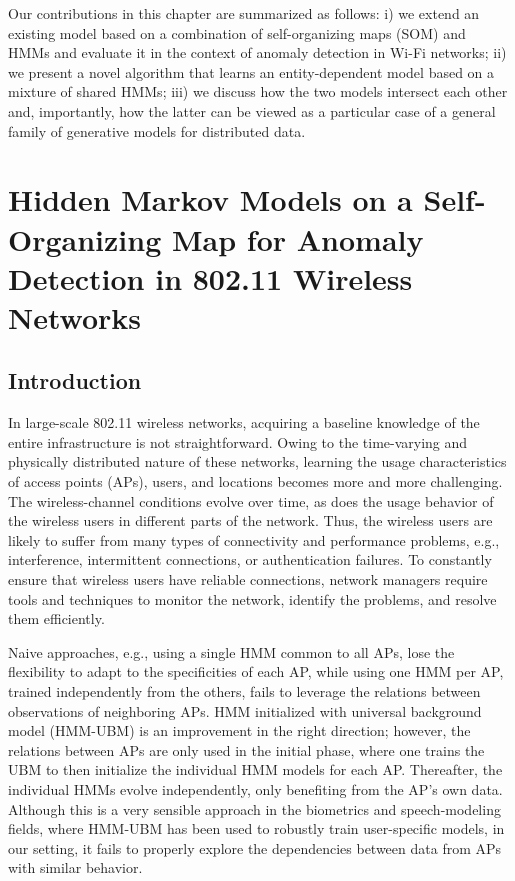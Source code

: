 Our contributions in this chapter are summarized as follows: i) we extend an existing model based on a combination of self-organizing maps (SOM) and HMMs and evaluate it in the context of anomaly detection in Wi-Fi networks; ii) we present a novel algorithm that learns an entity-dependent model based on a mixture of shared HMMs; iii) we discuss how the two models intersect each other and, importantly, how the latter can be viewed as a particular case of a general family of generative models for distributed data.

\section{Hidden Markov Models on a Self-Organizing Map for Anomaly Detection in 802.11 Wireless Networks}
\label{sec:sohmmm}

\subsection{Introduction}
\label{sec:sohmmm_intro}
In large-scale 802.11 wireless networks, acquiring a baseline knowledge of the entire infrastructure is not straightforward. Owing to the time-varying and physically distributed nature of these networks, learning the usage characteristics of access points (APs), users, and locations becomes more and more challenging. The wireless-channel conditions evolve over time, as does the usage behavior of the wireless users in different parts of the network. Thus, the wireless users are likely to suffer from many types of connectivity and performance problems, e.g., interference, intermittent connections, or authentication failures. To constantly ensure that wireless users have reliable connections, network managers require tools and techniques to monitor the network, identify the problems, and resolve them efficiently.

Naive approaches, e.g., using a single HMM common to all APs, lose the flexibility to adapt to the specificities of each AP, while using one HMM per AP, trained independently from the others, fails to leverage the relations between observations of neighboring APs. HMM initialized with universal background model (HMM-UBM) \cite{Ref7} is an improvement in the right direction; however, the relations between APs are only used in the initial phase, where one trains the UBM to then initialize the individual HMM models for each AP. Thereafter, the individual HMMs evolve independently, only benefiting from the AP's own data. Although this is a very sensible approach in the biometrics and speech-modeling fields, where HMM-UBM has been used to robustly train user-specific models, in our setting, it fails to properly explore the dependencies between data from APs with similar behavior. 

